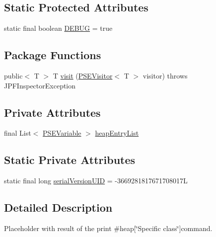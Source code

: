 \subsection*{Static Protected Attributes}
\begin{DoxyCompactItemize}
\item 
static final boolean \hyperlink{classgov_1_1nasa_1_1jpf_1_1inspector_1_1common_1_1pse_1_1_program_state_entry_a84ef5e9f23ec651d7a67a8ee72819b0e}{D\+E\+B\+UG} = true
\end{DoxyCompactItemize}
\subsection*{Package Functions}
\begin{DoxyCompactItemize}
\item 
public$<$ T $>$ T \hyperlink{classgov_1_1nasa_1_1jpf_1_1inspector_1_1common_1_1pse_1_1_p_s_e_heap_entry_list_a8bc4ffde6485527f412b4434185605f0}{visit} (\hyperlink{interfacegov_1_1nasa_1_1jpf_1_1inspector_1_1common_1_1pse_1_1_p_s_e_visitor}{P\+S\+E\+Visitor}$<$ T $>$ visitor)  throws J\+P\+F\+Inspector\+Exception 
\end{DoxyCompactItemize}
\subsection*{Private Attributes}
\begin{DoxyCompactItemize}
\item 
final List$<$ \hyperlink{classgov_1_1nasa_1_1jpf_1_1inspector_1_1common_1_1pse_1_1_p_s_e_variable}{P\+S\+E\+Variable} $>$ \hyperlink{classgov_1_1nasa_1_1jpf_1_1inspector_1_1common_1_1pse_1_1_p_s_e_heap_entry_list_a777716a1bbb347600a7b8c7ff40c9268}{heap\+Entry\+List}
\end{DoxyCompactItemize}
\subsection*{Static Private Attributes}
\begin{DoxyCompactItemize}
\item 
static final long \hyperlink{classgov_1_1nasa_1_1jpf_1_1inspector_1_1common_1_1pse_1_1_p_s_e_heap_entry_list_a3a38b1f254aac98575d01c1c0014cbb9}{serial\+Version\+U\+ID} = -\/3669281817671708017L
\end{DoxyCompactItemize}


\subsection{Detailed Description}
Placeholder with result of the {\ttfamily print \#heap\mbox{[}\char`\"{}\+Specific class\char`\"{}\mbox{]}{\ttfamily  command. }}

